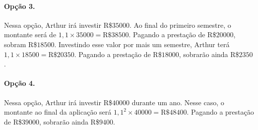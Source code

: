 \documentclass[a4paper]{article}
\begin{document}
\paragraph{Opção 3.} Nessa opção, Arthur irá investir R\$$35000$. Ao final do primeiro semestre, o montante será de $1,1\times 35000 = \text{R\$}38500$. Pagando a prestação de R\$$20000$, sobram R\$$18500$. Investindo esse valor por mais um semestre, Arthur terá $1,1\times 18500 = \text{R\$}20350$. Pagando a prestação de R\$$18000$, sobrarão ainda R\$$2350$.
\paragraph{Opção 4.} Nessa opção, Arthur irá investir R\$$40000$ durante um ano. Nesse caso, o montante ao final da aplicação será $1,1^2\times 40000 = \text{R\$}48400$. Pagando a prestação de R\$$39000$, sobrarão ainda R\$$9400$.
\end{document}
